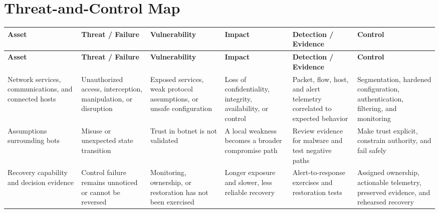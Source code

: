 \documentclass[11pt]{article}
\begin{document}
\section*{Threat-and-Control Map}
\begingroup\scriptsize\setlength{\tabcolsep}{2pt}
\begin{longtable}{>{\RaggedRight\arraybackslash}p{}>{\RaggedRight\arraybackslash}p{}>{\RaggedRight\arraybackslash}p{}>{\RaggedRight\arraybackslash}p{}>{\RaggedRight\arraybackslash}p{}>{\RaggedRight\arraybackslash}p{}}
\toprule\rowcolor{Navy}\color{white}\textbf{Asset} & \color{white}\textbf{Threat / Failure} & \color{white}\textbf{Vulnerability} & \color{white}\textbf{Impact} & \color{white}\textbf{Detection / Evidence} & \color{white}\textbf{Control}\\\midrule
\endfirsthead
\toprule\rowcolor{Navy}\color{white}\textbf{Asset} & \color{white}\textbf{Threat / Failure} & \color{white}\textbf{Vulnerability} & \color{white}\textbf{Impact} & \color{white}\textbf{Detection / Evidence} & \color{white}\textbf{Control}\\\midrule
\endhead
Network services, communications, and connected hosts & Unauthorized access, interception, manipulation, or disruption & Exposed services, weak protocol assumptions, or unsafe configuration & Loss of confidentiality, integrity, availability, or control & Packet, flow, host, and alert telemetry correlated to expected behavior & Segmentation, hardened configuration, authentication, filtering, and monitoring\\\midrule
Assumptions surrounding bots & Misuse or unexpected state transition & Trust in botnet is not validated & A local weakness becomes a broader compromise path & Review evidence for malware and test negative paths & Make trust explicit, constrain authority, and fail safely\\\midrule
Recovery capability and decision evidence & Control failure remains unnoticed or cannot be reversed & Monitoring, ownership, or restoration has not been exercised & Longer exposure and slower, less reliable recovery & Alert-to-response exercises and restoration tests & Assigned ownership, actionable telemetry, preserved evidence, and rehearsed recovery\\\midrule
\bottomrule
\end{longtable}
\endgroup
\end{document}
